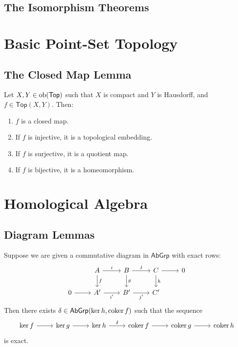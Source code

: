 \subsection*{The Isomorphism Theorems}

\section*{Basic Point-Set Topology}
\subsection*{The Closed Map Lemma}

\begin{lemma}
	Let $X,Y \in \operatorname{ob}(\mathsf{Top})$ such that $X$ is compact and $Y$ is Hausdorff, and $f \in \mathsf{Top}(X,Y)$. Then:
	\begin{enumerate}[label = \textup{(}\alph*\textup{)},wide = 0pt]
		\item $f$ is a closed map.
		\item If $f$ is injective, it is a topological embedding.
		\item If $f$ is surjective, it is a quotient map.
		\item If $f$ is bijective, it is a homeomorphism.
	\end{enumerate}
	\label{lem:closed_map_lemma}
\end{lemma}

\section*{Homological Algebra}
\subsection*{Diagram Lemmas}
\begin{proposition}
	Suppose we are given a commutative diagram in $\mathsf{AbGrp}$ with exact rows:
	\begin{equation*}
		\begin{tikzcd}
			& A \arrow[r,"i"]\arrow[d,"f"] & B \arrow[r,"j"]\arrow[d,"g"] & C \arrow[r]\arrow[d,"h"] & 0\\
			0 \arrow[r] & A' \arrow[r,"i'"'] & B' \arrow[r,"j'"'] & C'
		\end{tikzcd}
	\end{equation*}
	Then there exists $\delta \in \mathsf{AbGrp}(\ker h,\operatorname{coker} f)$ such that the sequence
	\begin{equation}
		\begin{tikzcd}
			 \ker f \arrow[r] & \ker g \arrow[r] & \ker h \arrow[r,"\delta"] & \coker f \arrow[r] & \coker g \arrow[r] & \coker h
		 \end{tikzcd}
	\end{equation}
	\noindent is exact.
	\label{prop:snake_lemma}
\end{proposition}

